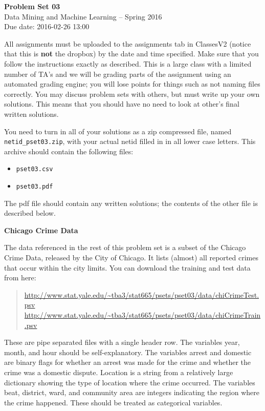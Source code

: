 \documentclass[12pt]{article}
\begin{document}
\begin{center}
{\bf Problem Set 03} \\
Data Mining and Machine Learning -- Spring 2016 \\
Due date: 2016-02-26 13:00
\end{center}

\medskip

All assignments must be uploaded to the assignments tab in ClassesV2
(notice that this is \textbf{not} the dropbox) by the date and time specified.
Make sure that you follow the instructions exactly as described.
This is a large class with a limited number of TA's and we will be
grading parts of the assignment using an automated grading engine;
you will lose points for things such as not naming files correctly.
You may discuss problem sets with others, but must write up your own
solutions. This means that you should have no need to look at other's
final written solutions.

You need to turn in all of your solutions as a zip compressed file, named
\texttt{netid\_pset03.zip}, with your actual netid filled in in all lower
case letters. This archive should contain the following files:
\begin{itemize}
\item \texttt{pset03.csv}
\item \texttt{pset03.pdf}
\end{itemize}
The pdf file should contain any written solutions; the contents of the
other file is described below.

\medskip

\textbf{Chicago Crime Data}

The data referenced in the rest of this problem set is a subset of the
Chicago Crime Data, released by the City of Chicago. It lists (almost)
all reported crimes that occur within the city limits. You
can download the training and test data from here:
\begin{quote}
\url{http://www.stat.yale.edu/~tba3/stat665/psets/pset03/data/chiCrimeTest.psv} \\
\url{http://www.stat.yale.edu/~tba3/stat665/psets/pset03/data/chiCrimeTrain.psv} \\
\end{quote}
These are pipe separated files with a single header row. The variables year, month,
and hour should be self-explanatory. The variables arrest and domestic are binary
flags for whether an arrest was made for the crime and whether the crime was a
domestic dispute. Location is a string from a relatively large dictionary showing
the type of location where the crime occurred. The variables beat, district, ward,
and community area are integers indicating the region where the crime happened.
These should be treated as categorical variables.
\end{document}
